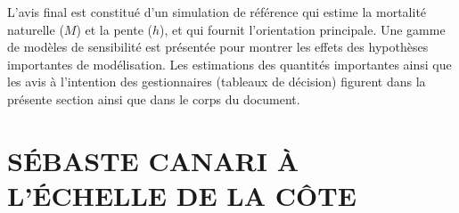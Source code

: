 \documentclass[11pt]{book}
\begin{document}
L'avis final est constitu\'{e} d'un simulation de r\'{e}f\'{e}rence qui estime la mortalit\'{e} naturelle ($M$) et la pente ($h$), et qui fournit l'orientation principale.
Une gamme de mod\`{e}les de sensibilit\'{e} est pr\'{e}sent\'{e}e pour montrer les effets des hypoth\`{e}ses importantes de mod\'{e}lisation. Les estimations des quantit\'{e}s importantes ainsi que les avis \`{a} l'intention des gestionnaires (tableaux de d\'{e}cision) figurent dans la pr\'{e}sente section ainsi que dans le corps du document.



\renewcommand*{\arraystretch}{1.1}%

\newcommand{\nSimsBase}{4\,000}%
\newcommand{\cSimsBase}{1\,000}%
\newcommand{\cBurnBase}{750}%
\newcommand{\nSimsSens}{2\,000}%
\newcommand{\cSimsSens}{500}%
\newcommand{\cBurnSens}{250}%
\newcommand{\nChains}{8}%
\newcommand{\cSamps}{250}%
\newcommand{\Nmcmc}{2\,000}%
\newcommand{\Nbase}{2\,000}%


\section{S\'{E}BASTE CANARI \`{A} L'\'{E}CHELLE DE LA C\^{O}TE}



\renewcommand{\startYear}{1935} %
\renewcommand{\currYear}{2023}   %
\renewcommand{\prevYear}{2022}   %
\renewcommand{\projYear}{2033}   %
\renewcommand{\pgenYear}{2108}   %
\end{document}
